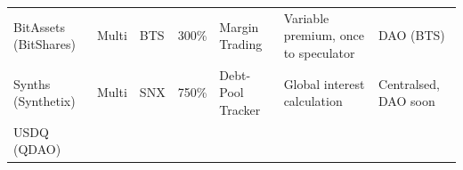 \documentclass[english,]{IEEEtran}
\begin{document}
\begin{longtable}[]{@{}lllllll@{}}
\begin{minipage}[t]{0.12\columnwidth}
BitAssets (BitShares)\strut
\end{minipage} & \begin{minipage}[t]{0.04\columnwidth}\raggedright\strut
Multi\strut
\end{minipage} & \begin{minipage}[t]{0.10\columnwidth}\raggedright\strut
BTS\strut
\end{minipage} & \begin{minipage}[t]{0.06\columnwidth}\raggedright\strut
300\%\strut
\end{minipage} & \begin{minipage}[t]{0.16\columnwidth}\raggedright\strut
Margin Trading\strut
\end{minipage} & \begin{minipage}[t]{0.20\columnwidth}\raggedright\strut
Variable premium, once to speculator\strut
\end{minipage} & \begin{minipage}[t]{0.12\columnwidth}\raggedright\strut
DAO (BTS)\strut
\end{minipage}\tabularnewline
\begin{minipage}[t]{0.12\columnwidth}\raggedright\strut
Synths (Synthetix)\strut
\end{minipage} & \begin{minipage}[t]{0.04\columnwidth}\raggedright\strut
Multi\strut
\end{minipage} & \begin{minipage}[t]{0.10\columnwidth}\raggedright\strut
SNX\strut
\end{minipage} & \begin{minipage}[t]{0.06\columnwidth}\raggedright\strut
750\%\strut
\end{minipage} & \begin{minipage}[t]{0.16\columnwidth}\raggedright\strut
Debt-Pool Tracker\strut
\end{minipage} & \begin{minipage}[t]{0.20\columnwidth}\raggedright\strut
Global interest calculation\strut
\end{minipage} & \begin{minipage}[t]{0.12\columnwidth}\raggedright\strut
Centralsed, DAO soon\strut
\end{minipage}\tabularnewline
\begin{minipage}[t]{0.12\columnwidth}\raggedright\strut
USDQ (QDAO)\strut
\end{minipage} & \begin{minipage}[t]{0.04\columnwidth}\raggedright\strut

\end{minipage}
\end{longtable}
\end{document}
